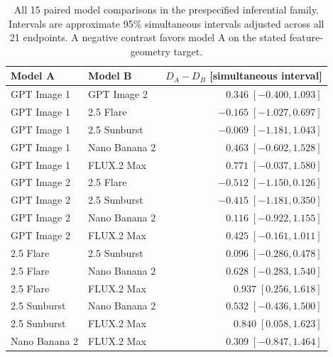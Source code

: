 \begin{table}[htbp]\centering\small
\begin{tabular}{llr}\toprule
Model A & Model B & $D_A-D_B$ [simultaneous interval]\\\midrule
GPT Image 1 & GPT Image 2 & $0.346\;[-0.400,1.093]$\\
GPT Image 1 & 2.5 Flare & $-0.165\;[-1.027,0.697]$\\
GPT Image 1 & 2.5 Sunburst & $-0.069\;[-1.181,1.043]$\\
GPT Image 1 & Nano Banana 2 & $0.463\;[-0.602,1.528]$\\
GPT Image 1 & FLUX.2 Max & $0.771\;[-0.037,1.580]$\\
GPT Image 2 & 2.5 Flare & $-0.512\;[-1.150,0.126]$\\
GPT Image 2 & 2.5 Sunburst & $-0.415\;[-1.181,0.350]$\\
GPT Image 2 & Nano Banana 2 & $0.116\;[-0.922,1.155]$\\
GPT Image 2 & FLUX.2 Max & $0.425\;[-0.161,1.011]$\\
2.5 Flare & 2.5 Sunburst & $0.096\;[-0.286,0.478]$\\
2.5 Flare & Nano Banana 2 & $0.628\;[-0.283,1.540]$\\
2.5 Flare & FLUX.2 Max & $0.937\;[0.256,1.618]$\\
2.5 Sunburst & Nano Banana 2 & $0.532\;[-0.436,1.500]$\\
2.5 Sunburst & FLUX.2 Max & $0.840\;[0.058,1.623]$\\
Nano Banana 2 & FLUX.2 Max & $0.309\;[-0.847,1.464]$\\
\bottomrule\end{tabular}
\caption{All 15 paired model comparisons in the prespecified inferential family. Intervals are approximate 95\% simultaneous intervals adjusted across all 21 endpoints. A negative contrast favors model A on the stated feature-geometry target.}
\label{tab:all-specificity-pairs}\end{table}

